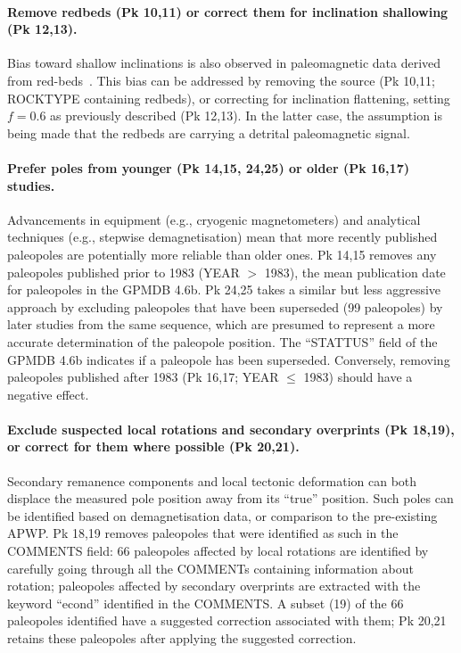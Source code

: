 \paragraph{Remove redbeds (Pk 10,11) or correct them for inclination
shallowing (Pk 12,13).} Bias toward shallow inclinations is also observed
in paleomagnetic data derived from red-beds~\cite[e.g., in central Asia,
Mediterranean region, North America, etc.]{T04,K04,T07,B10}. This bias can be
addressed by removing the source (Pk 10,11; ROCKTYPE containing redbeds), or
correcting for inclination flattening, setting $f=0.6$ as previously described
(Pk 12,13). In the latter case, the assumption is being made that the
redbeds are carrying a detrital paleomagnetic signal.

\paragraph{Prefer poles from younger (Pk 14,15, 24,25) or older (Pk 16,17)
studies.} Advancements in equipment (e.g., cryogenic magnetometers) and
analytical techniques (e.g., stepwise demagnetisation) mean that more recently
published paleopoles are potentially more reliable than older ones. Pk 14,15
removes any paleopoles published prior to 1983 (YEAR $>$ 1983), the mean
publication date for paleopoles in the GPMDB 4.6b. Pk 24,25 takes a similar but
less aggressive approach by excluding paleopoles that have been superseded (99
paleopoles) by later studies from the same sequence, which are presumed to
represent a more accurate determination of the paleopole position. The
``STATTUS'' field of the GPMDB 4.6b indicates if a paleopole has been
superseded. Conversely, removing paleopoles published after 1983 (Pk 16,17;
YEAR $\leq$ 1983) should have a negative effect.

\paragraph{Exclude suspected local rotations and secondary overprints (Pk
18,19), or correct for them where possible (Pk 20,21).} Secondary remanence
components and local tectonic deformation can both displace the measured pole
position away from its ``true'' position. Such poles can be identified based on
demagnetisation data, or comparison to the pre-existing APWP\@. Pk 18,19
removes paleopoles that were identified as such in the COMMENTS field: 66
paleopoles affected by local rotations are identified by carefully going through
all the COMMENTs containing information about rotation; paleopoles affected by
secondary overprints are extracted with the keyword ``econd'' identified in the
COMMENTS\@. A subset (19) of the 66 paleopoles identified have a suggested
correction associated with them; Pk 20,21 retains these paleopoles after
applying the suggested correction.

